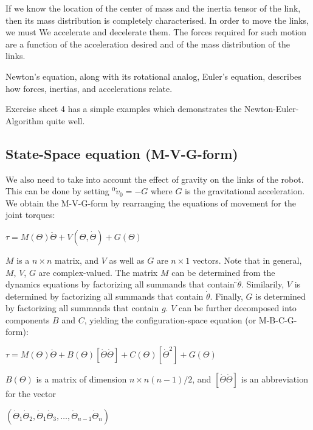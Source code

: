 If we know the location of the center of mass and the inertia tensor of the link, then its mass
distribution is completely characterised. In order to move the links, we must
We accelerate and decelerate them. The forces required for such motion are a function
of the acceleration desired and of the mass distribution of the links. 

Newton's equation, along with its rotational analog, Euler's equation, describes how forces, inertias, and accelerations relate.

Exercise sheet 4 has a simple examples which demonstrates the Newton-Euler-Algorithm quite well.

\subsection{State-Space equation (M-V-G-form)}

We also need to take into account the effect of gravity on the links of the robot. This can be done by setting ${ }^{0} \dot{v}_{0}=-G$ where $G$ is the gravitational acceleration. We obtain the M-V-G-form by rearranging the equations of movement for the joint torques:

\begin{center}
	$\tau=M(\Theta) \ddot{\Theta}+V(\Theta, \dot{\Theta})+G(\Theta)$
\end{center}

$M$ is a $n\times n$ matrix, and $V$ as well as $G$ are $n\times 1$ vectors. Note that in general, $M$, $V$, $G$ are complex-valued. The matrix $M$ can be determined from the dynamics equations by factorizing all summands that contain  ̈$\ddot{\theta}$. Similarily, $V$ is determined by factorizing all summands that contain $\dot{\theta}$. Finally, $G$ is determined by factorizing all summands that contain $g$. $V$ can be further decomposed into components $B$ and $C$, yielding the configuration-space equation (or M-B-C-G-form):

\begin{center}
	$\tau=M(\Theta) \ddot{\Theta}+B(\Theta)[\dot{\Theta} \dot{\Theta}]+C(\Theta)\left[\dot{\Theta}^{2}\right]+G(\Theta)$
\end{center}

$B(\Theta)$ is a matrix of dimension $n \times n(n-1) / 2$, and $[\dot{\Theta} \dot{\Theta}]$ is an abbreviation for the vector

\begin{center}
	$\left(\dot{\Theta}_{1} \dot{\Theta}_{2}, \dot{\Theta}_{1} \dot{\Theta}_{3}, \ldots, \dot{\Theta}_{n-1} \dot{\Theta}_{n}\right)$
\end{center}

